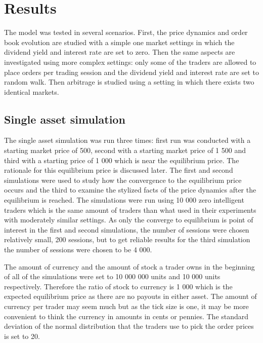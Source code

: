 
\section{Results}

The model was tested in several scenarios. First, the price 
dynamics and order book evolution are studied with a simple one market settings in which the dividend
yield and interest rate are set to zero. Then the same aspects are investigated
using more complex settings: only some of the traders are allowed to place orders
per trading session and the dividend yield and interest rate are set to random walk.
Then arbitrage is studied using 
a setting in which there exists two identical markets.


\subsection{Single asset simulation}
The single asset simulation was run three times: first run
was conducted with a starting market price of 500, second
with a starting market price of 1 500 and third with a starting
price of 1 000 which is near the equilibrium price. The rationale
for this equilibrium price is discussed later.
The first and second simulations were
used to study how the convergence to the equilibrium price occurs
and the third to examine the stylized facts of the price
dynamics after the equilibrium is reached. The simulations were
run using 10 000 zero intelligent traders which is the 
same amount of traders than what \citet{Raberto05} used in their experiments
with moderately similar settings. As only the converge to equilibrium is 
point of interest in the first and second simulations, the number of sessions
were chosen relatively small, 200 sessions, but to get reliable results for
the third simulation the number of sessions were chosen to be 4 000.

The amount of currency and the amount of stock 
a trader owns in the beginning of all of the simulations were set to
10 000 000 units and 10 000 units respectively. Therefore
the ratio of stock to currency is 1 000 which
is the expected equilibrium price as there are
no payouts in either asset. The amount of currency
per trader may seem much but as the tick size is one,
it may be more convenient to think the currency in amounts
in cents or pennies. The standard deviation of
the normal distribution that the traders use to pick the order prices
is set to 20.

